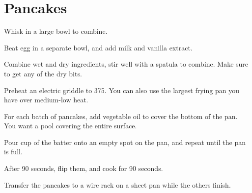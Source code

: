 \section{Pancakes}
\begin{recipe}



Whisk in a large bowl to combine.


Beat egg in a separate bowl, and add milk and vanilla extract. 

Combine wet and dry ingredients, stir well with a spatula to combine. Make sure to 
get any of the dry bits. 


Preheat an electric griddle to 375\degree{}. You can also use the largest frying pan you have over medium-low heat.

For each batch of pancakes, add vegetable oil to cover the bottom of the pan. You want a pool covering the entire surface.

Pour  cup of the batter onto an empty spot on the pan, and repeat until the pan is full.

After 90 seconds, flip them, and cook for 90 seconds.

Transfer the pancakes to a wire rack on a sheet pan while the others finish.

\end{recipe}
